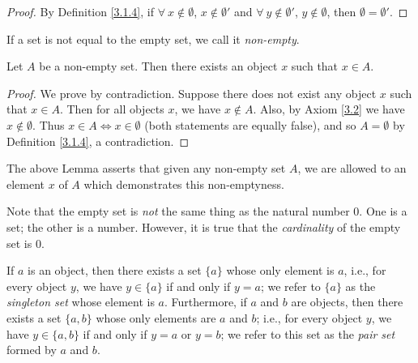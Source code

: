\begin{proof}
By Definition \ref{3.1.4}, if \(\forall\ x \notin \emptyset\), \(x \notin \emptyset'\) and \(\forall\ y \notin \emptyset'\), \(y \notin \emptyset\), then \(\emptyset = \emptyset'\).
\end{proof}

\begin{note}
If a set is not equal to the empty set, we call it \emph{non-empty}.
\end{note}

\setcounter{theorem}{5}
\begin{lemma}\label{3.1.6}
Let \(A\) be a non-empty set.
Then there exists an object \(x\) such that \(x \in A\).
\end{lemma}

\begin{proof}
We prove by contradiction.
Suppose there does not exist any object \(x\) such that \(x \in A\).
Then for all objects \(x\), we have \(x \notin A\).
Also, by Axiom \ref{3.2} we have \(x \notin \emptyset\).
Thus \(x \in A \iff x \in \emptyset\) (both statements are equally false), and so \(A = \emptyset\) by Definition \ref{3.1.4}, a contradiction.
\end{proof}

\begin{remark}\label{3.1.7}
The above Lemma asserts that given any non-empty set \(A\), we are allowed to  an element \(x\) of \(A\) which demonstrates this non-emptyness.
\end{remark}

\begin{remark}\label{3.1.8}
Note that the empty set is \emph{not} the same thing as the natural number \(0\).
One is a set;
the other is a number.
However, it is true that the \emph{cardinality} of the empty set is \(0\).
\end{remark}

\begin{axiom}\label{3.3}
If \(a\) is an object, then there exists a set \(\{a\}\) whose only element is \(a\), i.e., for every object \(y\), we have \(y \in \{a\}\) if and only if \(y = a\);
we refer to \(\{a\}\) as the \emph{singleton set} whose element is \(a\).
Furthermore, if \(a\) and \(b\) are objects, then there exists a set \(\{a, b\}\) whose only elements are \(a\) and \(b\);
i.e., for every object \(y\), we have \(y \in \{a, b\}\) if and only if \(y = a\) or \(y = b\);
we refer to this set as the \emph{pair set} formed by \(a\) and \(b\).
\end{axiom}

